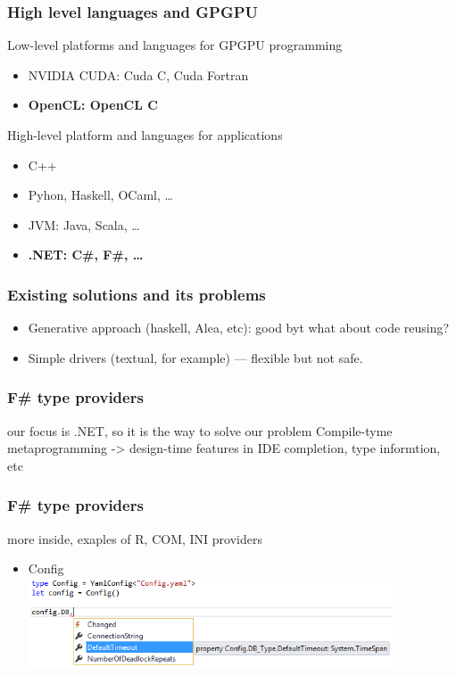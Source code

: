 \documentclass[xcolor=table]{beamer}
\begin{document}
\begin{frame}
  \transwipe[direction=90]
  \frametitle{High level languages and GPGPU}
\begin{minipage}[m]{0.45\linewidth}
Low-level platforms and languages for GPGPU programming
\begin{itemize}
\item NVIDIA CUDA: Cuda C, Cuda Fortran
\item \textbf{OpenCL: OpenCL C}
\end{itemize}
\end{minipage}\hfill
\begin{minipage}[m]{0.45\linewidth}
High-level platform and languages for applications
\begin{itemize}
      \item C++
      \item Pyhon, Haskell, OCaml, \dots
      \item JVM: Java, Scala, \dots 
      \item \textbf{.NET: C\#, F\#, \dots}
\end{itemize}
\end{minipage}

\pause
\vspace{1cm}
\end{frame}

\begin{frame}[fragile]
  \transwipe[direction=90]
  \frametitle{Existing solutions and its problems}
  \begin{itemize}
  \item Generative approach (haskell, Alea, etc): good byt what about code reusing?
  \item Simple drivers (textual, for example) --- flexible but not safe.
  \end{itemize}
\end{frame}

\begin{frame}
  \transwipe[direction=90]
  \frametitle{F\# type providers}
  our focus is .NET, so it is the way to solve our problem
  Compile-tyme metaprogramming -> design-time features in IDE
  completion, type informtion, etc
\end{frame}

\begin{frame}
  \transwipe[direction=90]
  \frametitle{F\# type providers}
  more inside, exaples of R, COM, INI providers
  \begin{itemize}
    \item Config \\
     {\includegraphics[width=0.85\textwidth]{pictures/YamlConfigProvider.png}}
  \end{itemize}
\end{frame}
\end{document}
